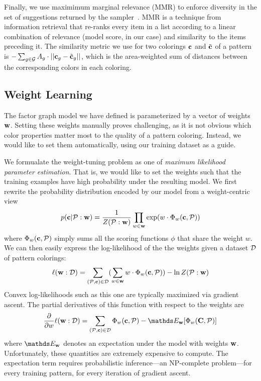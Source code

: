 Finally, we use maximimum marginal relevance (MMR) to enforce diversity in the set of suggestions returned by the sampler~\cite{MMR}. MMR is a technique from information retrieval that re-ranks every item in a list according to a linear combination of relevance (model score, in our case) and similarity to the items preceding it. The similarity metric we use for two colorings $\mathbf{c}$ and $\tilde{\mathbf{c}}$ of a pattern is $- \sum_{g \in \mathcal{G}} {A_g \cdot ||\mathbf{c}_g - \tilde{\mathbf{c}}_g||}$, which is the area-weighted sum of \lab distances between the corresponding colors in each coloring.

\subsection{Weight Learning}
\label{sec:weights}

The factor graph model we have defined is parameterized by a vector of weights $\mathbf{w}$. Setting these weights manually proves challenging, as it is not obvious which color properties matter most to the quality of a pattern coloring. Instead, we would like to set them automatically, using our training dataset as a guide.

We formualate the weight-tuning problem as one of \emph{maximum likelihood parameter estimation}. That is, we would like to set the weights such that the training examples have high probability under the resulting model. We first rewrite the probability distribution encoded by our model from a weight-centric view
\begin{equation*}
p(\mathbf{c} | \mathcal{P} : \mathbf{w}) = \frac{1}{Z(\mathcal{P} : \mathbf{w})} \prod_{w \in \mathbf{w}} \exp(w \cdot \Phi_w(\mathbf{c}, \mathcal{P}))
\end{equation*}
where $\Phi_w(\mathbf{c}, \mathcal{P})$ simply sums all the scoring functions $\phi$ that share the weight $w$. We can then easily express the log-likelihood of the the weights given a dataset $\mathcal{D}$ of pattern colorings:
\begin{equation*}
\ell(\mathbf{w} : \mathcal{D}) =
	\sum_{(\mathcal{P}, \mathbf{c}) \in \mathcal{D}}
	(
		\sum_{w \in \mathbf{w}}
			w \cdot \Phi_w(\mathbf{c}, \mathcal{P})
	)			
		- \ln{Z(\mathcal{P}: \mathbf{w})}
\end{equation*}
Convex log-likelihoods such as this one are typically maximized via gradient ascent. The partial derivatives of this function with respect to the weights are
\begin{equation*}
\frac{\partial}{\partial w} \ell(\weights : \dataset) = 
	\sum_{(\pattern, \colors) \in \dataset}
			\weightStats(\colors, \pattern)
		- \expectation_\weights[\weightStats(\colorVars, \pattern)]
\end{equation*}
where $\expectation_\weights$ denotes an expectation under the model with weights $\mathbf{w}$. Unfortunately, these quantities are extremely expensive to compute. The expectation term requires probabilistic inference---an NP-complete problem---for every training pattern, for every iteration of gradient ascent.

